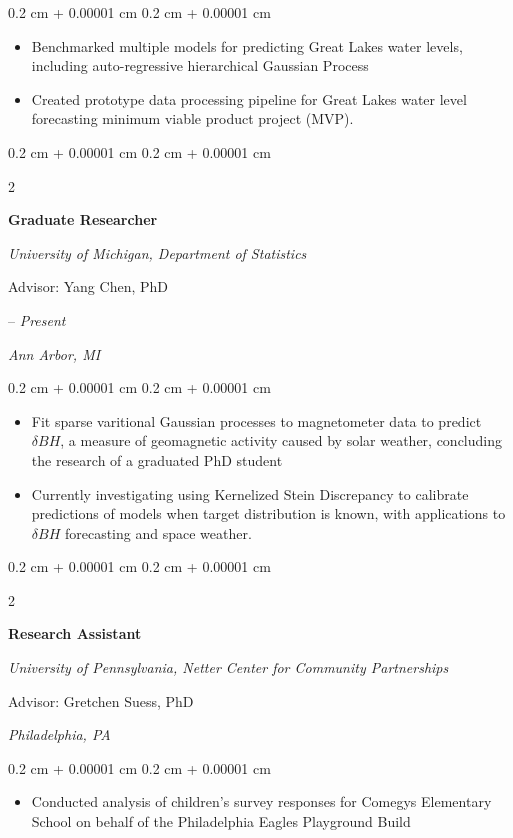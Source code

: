 \documentclass[11pt, letterpaper]{article}
\newenvironment{highlights}{
    \begin{itemize}[
        topsep=0.10 cm,
        parsep=0.10 cm,
        partopsep=0pt,
        itemsep=0pt,
        leftmargin=0.4 cm + 10pt
    ]
}{
    \end{itemize}
} %
\newenvironment{onecolentry}{
    \begin{adjustwidth}{
        0.2 cm + 0.00001 cm
    }{
        0.2 cm + 0.00001 cm
    }
}{
    \end{adjustwidth}
} %
\newenvironment{twocolentry}[2][]{
    \onecolentry
    \def\secondColumn{#2}
    \setcolumnwidth{\fill, 4.5 cm}
    \begin{paracol}{2}
}{
    \switchcolumn \raggedleft \secondColumn
    \end{paracol}
    \endonecolentry
} %
\begin{document}
\vspace{0.05 cm}
\begin{onecolentry}
    \begin{highlights}
        \item Benchmarked multiple models for predicting Great Lakes water levels, including auto-regressive hierarchical Gaussian Process
        \item Created prototype data processing pipeline for Great Lakes water level forecasting minimum viable product project (MVP).
    \end{highlights}
\end{onecolentry}


\vspace{0.2 cm}
\begin{twocolentry}{2022 – \textit{Present}
    
    \textit{Ann Arbor, MI}
    }
    \textbf{Graduate Researcher}

    \textit{University of Michigan, Department of Statistics}

    Advisor: Yang Chen, PhD
\end{twocolentry}

\vspace{0.05 cm}
\begin{onecolentry}
    \begin{highlights}
        \item Fit sparse varitional Gaussian processes to magnetometer data to predict $\delta BH$, a measure of geomagnetic activity caused by solar weather,
        concluding the research of a graduated PhD student
        \item Currently investigating using Kernelized Stein Discrepancy to calibrate predictions of models when target distribution is known, with applications to $\delta BH$ forecasting and space weather.
    \end{highlights}
\end{onecolentry}


\vspace{0.2 cm}
\begin{twocolentry}{2014

    \textit{Philadelphia, PA}
    }
    \textbf{Research Assistant}

    \textit{University of Pennsylvania, Netter Center for Community Partnerships}

    Advisor: Gretchen Suess, PhD
\end{twocolentry}

\vspace{0.05 cm}
\begin{onecolentry}
    \begin{highlights}
        \item Conducted analysis of children's survey responses for Comegys Elementary School on behalf of the Philadelphia Eagles Playground Build
    \end{highlights}
\end{onecolentry}
\end{document}
